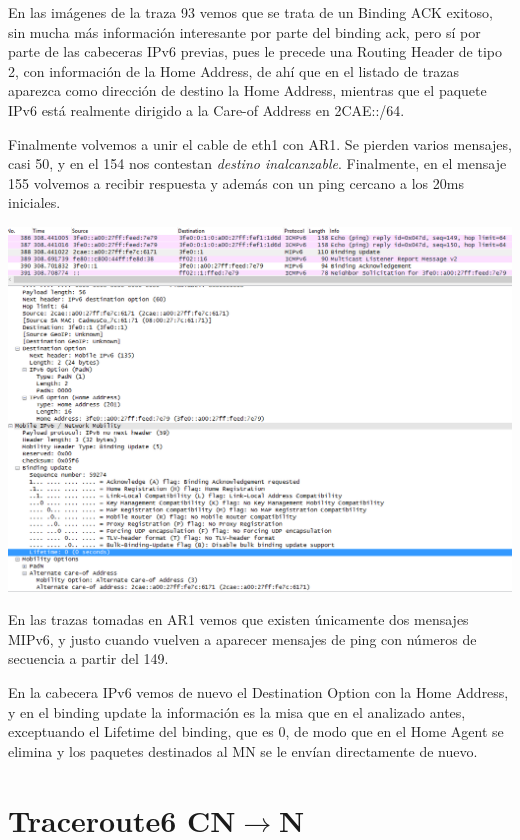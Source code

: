 \documentclass{article}
\begin{document}
En las imágenes de la traza 93 vemos que se trata de un Binding ACK exitoso, sin mucha más información interesante por parte del binding ack, pero sí por parte de las cabeceras IPv6 previas, pues le precede una Routing Header de tipo 2, con información de la Home Address, de ahí que en el listado de trazas aparezca como dirección de destino la Home Address, mientras que el paquete IPv6 está realmente dirigido a la Care-of Address en 2CAE::/64.



Finalmente volvemos a unir el cable de eth1 con AR1. Se pierden varios mensajes, casi 50, y en el 154 nos contestan \textit{destino inalcanzable}. Finalmente, en el mensaje 155 volvemos a recibir respuesta y además con un ping cercano a los 20ms iniciales.

\begin{center}
	\includegraphics[scale=0.6]{images/bindEND.PNG}
\end{center}


En las trazas tomadas en AR1 vemos que existen únicamente dos mensajes MIPv6, y justo cuando vuelven a aparecer mensajes de ping con números de secuencia a partir del 149.

En la cabecera IPv6 vemos de nuevo el Destination Option con la Home Address, y en el binding update la información es la misa que en el analizado antes, exceptuando el Lifetime del binding, que es 0, de modo que en el Home Agent se elimina y los paquetes destinados al MN se le envían directamente de nuevo.



\section{Traceroute6 CN\texorpdfstring{$\rightarrow$}MN}
\end{document}
